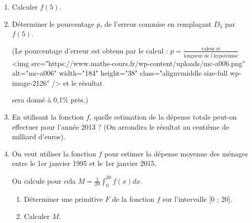 \begin{enumerate}
     \item
     Calculer $f\left(5\right)$.
     \item
     Déterminer le pourcentage $p$, de l'erreur commise en remplaçant $D_{5}$ par $f\left(5\right)$.
     \par
     (Le pourcentage d'erreur est obtenu par le calcul : $p=$\nosp$\frac{\text{valeur ré}}{\text{longueur\ de\ l} ^{\prime} \text{hypoténuse}}$<img src="https://www.maths-cours.fr/wp-content/uploads/mc-a006.png" alt="mc-a006" width="184" height="38" class="alignvmiddle size-full wp-image-2126" />	et le résultat
     \par
     sera donné à 0,1\% près.)
     \item
     En utilisant la fonction $f$, quelle estimation de la dépense totale peut-on effectuer pour l'année 2013 ? (On arrondira le résultat au centième de milliard d'euros).
     \item
     On veut utiliser la fonction $f$ pour estimer la dépense moyenne des ménages entre le 1er janvier 1995 et le 1er janvier 2015.
     \par
     On calcule pour cela $M=\frac{1}{20} \int_{0}^{20} f\left(x\right)dx$.
     \begin{enumerate}[label=\alph*.]
          \item
          Déterminer une primitive $F$ de la fonction $f$ sur l'intervalle [0 ; 20].
          \item
     Calculer $M$.\end{enumerate}
\end{enumerate}
